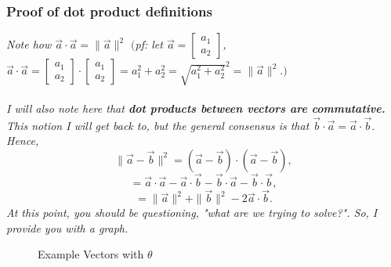 \documentclass[addpoints]{exam}
\begin{document}
\subsubsection{
Proof of dot product definitions
}
\textit{
Note how $\vec{a}\cdot\vec{a} = \|\vec{a}\|^2$ $\big($pf: let $\vec{a} = \begin{bmatrix} a_1\\a_2\end{bmatrix}$, $\vec{a}\cdot\vec{a} = \begin{bmatrix} a_1\\a_2\end{bmatrix}\cdot\begin{bmatrix} a_1\\a_2\end{bmatrix} = a_1^2+a_2^2=\sqrt{a_1^2+a^2_2}^2=\|\vec{a}\|^2.\big)$\\\\
I will also note here that \textbf{dot products between vectors are commutative. } This notion I will get back to, but the general consensus is that $\vec{b}\cdot\vec{a}=\vec{a}\cdot\vec{b}.$
Hence, \[\|\vec{a}-\vec{b}\|^2=(\vec{a}-\vec{b})\cdot(\vec{a}-\vec{b}),\]
\[=\vec{a}\cdot\vec{a}-\vec{a}\cdot\vec{b}-\vec{b}\cdot\vec{a}-\vec{b}\cdot\vec{b},\]
\[=\|\vec{a}\|^2+\|\vec{b}\|^2-2\vec{a}\cdot\vec{b}.\]
}
\pagebreak\textit{
At this point, you should be questioning, "what are we trying to solve?". So, I provide you with a graph. 
}
\begin{figure}[!h]
    \centering
    \caption{Example Vectors with $\theta$}
    \label{fig:Example Vectors}
\end{figure}\\
\end{document}
